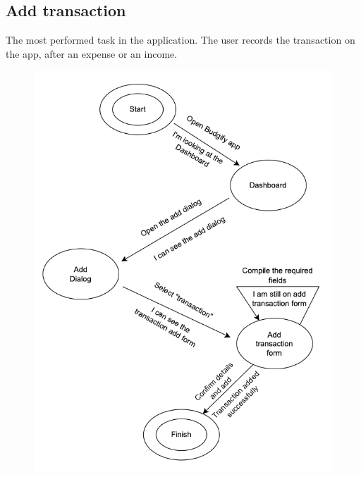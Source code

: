 \documentclass[a4paper,12pt]{article}
\begin{document}
\subsection{Add transaction}
The most performed task in the application. The user records the transaction on the app, after an expense or an income.
\begin{figure}[H]
    \centering
    \includegraphics[scale=0.5]{STN1.png}
\end{figure}
\vspace{5cm}
\end{document}
